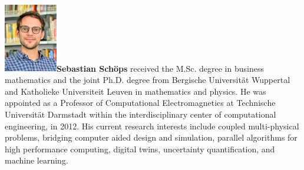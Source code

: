 \documentclass[AMA,STIX1COL]{WileyNJD-v2}
\begin{document}
\begin{biography}{\includegraphics[width=66pt,height=86pt]{schoeps}}{\textbf{Sebastian Schöps} received the M.Sc. degree in business mathematics and the joint Ph.D. degree from Bergische Universität Wuppertal and Katholieke Universiteit Leuven in mathematics and physics. He was appointed as a Professor of Computational Electromagnetics at Technische Universität Darmstadt within the interdisciplinary center of computational engineering, in 2012. His current research interests include coupled multi-physical problems, bridging computer aided design and simulation, parallel algorithms for high performance computing, digital twins, uncertainty quantification, and machine learning.}
\end{biography}
\end{document}
